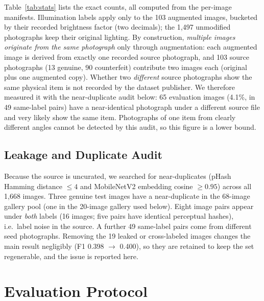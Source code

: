 \documentclass[conference]{IEEEtran}
\begin{document}
Table~\ref{tab:stats} lists the exact counts, all computed from the
per-image manifests. Illumination labels apply only to the 103 augmented
images, bucketed by their recorded brightness factor (two decimals); the
1{,}497 unmodified photographs keep their original lighting. By
construction, \emph{multiple images originate from the same photograph}
only through augmentation: each augmented image is derived from exactly
one recorded source photograph, and 103 source photographs (13 genuine, 90
counterfeit) contribute two images each (original plus one augmented
copy). Whether two \emph{different} source photographs show the same
physical item is not recorded by the dataset publisher. We therefore
measured it with the near-duplicate audit below: 65 evaluation images
(4.1\%, in 49 same-label pairs) have a near-identical photograph under a
different source file and very likely show the same item. Photographs of
one item from clearly different angles cannot be detected by this audit,
so this figure is a lower bound.

\subsection{Leakage and Duplicate Audit}
\label{sec:dupaudit}

Because the source is uncurated, we searched for near-duplicates (pHash
Hamming distance $\leq 4$ and MobileNetV2 embedding cosine $\geq 0.95$)
across all 1{,}668 images. Three genuine test images have a near-duplicate
in the 68-image gallery pool (one in the 20-image gallery used below).
Eight image pairs appear under \emph{both} labels (16 images; five pairs
have identical perceptual hashes), i.e.\ label noise in the source. A
further 49 same-label pairs come from different seed photographs.
Removing the 19 leaked or cross-labeled images changes the main result
negligibly (F1 0.398 $\rightarrow$ 0.400), so they are retained to keep
the set regenerable, and the issue is reported here.

\section{Evaluation Protocol}
\label{sec:protocol}
\end{document}
